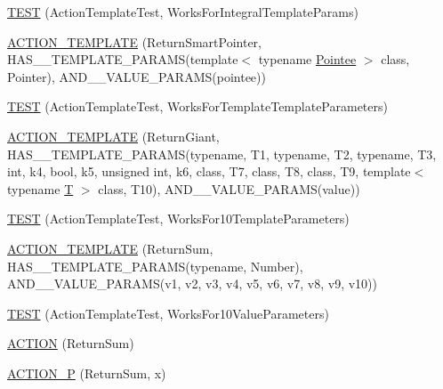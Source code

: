 \begin{DoxyCompactItemize}
\item 
\hyperlink{namespacetesting_1_1gmock__generated__actions__test_aad8d77a35ac21f366dc334a45cf5b140}{T\+E\+ST} (Action\+Template\+Test, Works\+For\+Integral\+Template\+Params)
\item 
\hyperlink{namespacetesting_1_1gmock__generated__actions__test_ad99d926be507eb0c031538da2e8bb838}{A\+C\+T\+I\+O\+N\+\_\+\+T\+E\+M\+P\+L\+A\+TE} (Return\+Smart\+Pointer, H\+A\+S\+\_\+\_\+\+T\+E\+M\+P\+L\+A\+T\+E\+\_\+\+P\+A\+R\+A\+MS(template$<$ typename \hyperlink{namespacetesting_a5122ca3533f3a00f67e146dd81f3b68c}{Pointee} $>$ class, Pointer), A\+N\+D\+\_\+\_\+\+V\+A\+L\+U\+E\+\_\+\+P\+A\+R\+A\+MS(pointee))
\item 
\hyperlink{namespacetesting_1_1gmock__generated__actions__test_a8908d6badc9054adebdaf5ed8d455c2d}{T\+E\+ST} (Action\+Template\+Test, Works\+For\+Template\+Template\+Parameters)
\item 
\hyperlink{namespacetesting_1_1gmock__generated__actions__test_aea61dba8f93605f3e8c1cdedfd1079f5}{A\+C\+T\+I\+O\+N\+\_\+\+T\+E\+M\+P\+L\+A\+TE} (Return\+Giant, H\+A\+S\+\_\+\_\+\+T\+E\+M\+P\+L\+A\+T\+E\+\_\+\+P\+A\+R\+A\+MS(typename, T1, typename, T2, typename, T3, int, k4, bool, k5, unsigned int, k6, class, T7, class, T8, class, T9, template$<$ typename \hyperlink{functions__7_8js_adf1f3edb9115acb0a1e04209b7a9937b}{T} $>$ class, T10), A\+N\+D\+\_\+\_\+\+V\+A\+L\+U\+E\+\_\+\+P\+A\+R\+A\+MS(value))
\item 
\hyperlink{namespacetesting_1_1gmock__generated__actions__test_a39707e50b998b0866ea7dec54099f38f}{T\+E\+ST} (Action\+Template\+Test, Works\+For10\+Template\+Parameters)
\item 
\hyperlink{namespacetesting_1_1gmock__generated__actions__test_a0e21a6c1f43a7125a29e6e1edcd7006c}{A\+C\+T\+I\+O\+N\+\_\+\+T\+E\+M\+P\+L\+A\+TE} (Return\+Sum, H\+A\+S\+\_\+\_\+\+T\+E\+M\+P\+L\+A\+T\+E\+\_\+\+P\+A\+R\+A\+MS(typename, Number), A\+N\+D\+\_\+\_\+\+V\+A\+L\+U\+E\+\_\+\+P\+A\+R\+A\+MS(v1, v2, v3, v4, v5, v6, v7, v8, v9, v10))
\item 
\hyperlink{namespacetesting_1_1gmock__generated__actions__test_aa8dd9ea1777fe67626bab2815b7261f4}{T\+E\+ST} (Action\+Template\+Test, Works\+For10\+Value\+Parameters)
\item 
\hyperlink{namespacetesting_1_1gmock__generated__actions__test_a49c180470c75de1ab88cd2928e738d33}{A\+C\+T\+I\+ON} (Return\+Sum)
\item 
\hyperlink{namespacetesting_1_1gmock__generated__actions__test_acae7628c76df0e3b54ea80459fe3cf60}{A\+C\+T\+I\+O\+N\+\_\+P} (Return\+Sum, x)

\end{DoxyCompactItemize}
